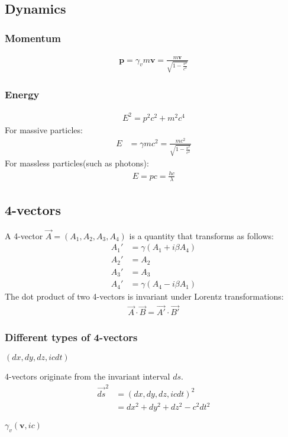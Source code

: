 \documentclass[11pt]{article}
\newcommand{\ve}[1]{\ensuremath{\boldsymbol{#1}}}
\newcommand{\fve}[1]{\ensuremath{\vec{#1}}}
\begin{document}
\begin{multicols*}{3}
\subsection{Dynamics}
\subsubsection*{Momentum}
	\begin{align*}
	\ve{p}=\gamma_vm\ve{v}=\frac{m\ve{v}}{\sqrt{1-\frac{v^2}{c^2}}}
	\end{align*}
\subsubsection*{Energy}
	\begin{align*}
	E^2=p^2c^2+m^2c^4
	\end{align*}
For massive particles:
	\begin{align*}
	E&=\gamma mc^2=\frac{mc^2}{\sqrt{1-\frac{v^2}{c^2}}}
	\end{align*}
For massless particles(such as photons):
	\begin{align*}
	E=pc=\frac{hc}{\lambda}
	\end{align*}
\subsection{4-vectors}
A 4-vector $\fve{A}=(A_1,A_2,A_3,A_4)$ is a quantity that transforms as follows:
	\begin{align*}
	A_1'&= \gamma(A_1+i\beta A_4)\\
	A_2'&= A_2\\
	A_3'&= A_3\\
	A_4'&= \gamma(A_4-i\beta A_1)
	\end{align*}
The dot product of two 4-vectors is invariant under Lorentz transformations:
	\begin{align*}
	\fve{A}\cdot\fve{B}=\fve{A'}\cdot\fve{B'}
	\end{align*}
\subsubsection*{Different types of 4-vectors}
\begin{description}
\setlength{\itemsep}{-2mm}
\item[4-position] $(dx, dy, dz, icdt)$

4-vectors originate from the invariant interval $ds$.
	\begin{align*}
	\fve{ds}^2&=(dx, dy, dz, icdt)^2 \\
	&=dx^2+dy^2+dz^2-c^2dt^2
	\end{align*}
\item[4-velocity] $\gamma_v(\ve{v},ic)$


\end{description}
\end{multicols*}
\end{document}
